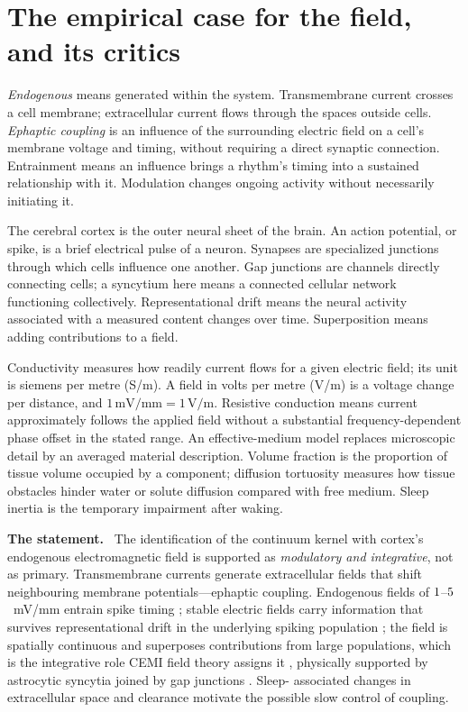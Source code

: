 \documentclass[11pt]{article}
\newcommand{\statement}{\par\smallskip\noindent\textbf{The statement.}\ }
\begin{document}
\section{The empirical case for the field, and its critics}

\emph{Endogenous} means generated within the system. Transmembrane current
crosses a cell membrane; extracellular current flows through the spaces
outside cells. \emph{Ephaptic coupling} is an influence of the surrounding
electric field on a cell's membrane voltage and timing, without requiring a
direct synaptic connection. Entrainment means an influence brings a rhythm's
timing into a sustained relationship with it. Modulation changes ongoing
activity without necessarily initiating it.

The cerebral cortex is the outer neural sheet of the brain. An action
potential, or spike, is a brief electrical pulse of a neuron. Synapses are
specialized junctions through which cells influence one another. Gap junctions
are channels directly connecting cells; a syncytium here means a connected
cellular network functioning collectively. Representational drift means the
neural activity associated with a measured content changes over time.
Superposition means adding contributions to a field.

Conductivity measures how readily current flows for a given electric field;
its unit is siemens per metre (S/m). A field in volts per metre (V/m) is a
voltage change per distance, and $1\,\mathrm{mV/mm}=1\,\mathrm{V/m}$.
Resistive conduction means current approximately follows the applied field
without a substantial frequency-dependent phase offset in the stated range.
An effective-medium model replaces microscopic detail by an averaged material
description. Volume fraction is the proportion of tissue volume occupied by
a component; diffusion tortuosity measures how tissue obstacles hinder water
or solute diffusion compared with free medium. Sleep inertia is the temporary
impairment after waking.

\statement
The identification of the continuum kernel with cortex's endogenous
electromagnetic field is supported as \emph{modulatory and integrative}, not as
primary. Transmembrane currents generate extracellular fields that shift
neighbouring membrane potentials---ephaptic coupling. Endogenous fields of
$1$--$5$~mV/mm entrain spike timing
\citep{frohlich2010,anastassiou2015}; stable electric fields carry information
that survives representational drift in the underlying spiking population
\citep{pinotsis2022,pinotsis2023ephaptic,pinotsis2023cytoelectric}; the field
is spatially continuous and superposes contributions from large populations,
which is the integrative role CEMI field theory assigns it
\citep{mcfadden2002,mcfadden2020,pockett2012}, physically supported by
astrocytic syncytia joined by gap junctions \citep{verkhratsky2018}. Sleep-
associated changes in extracellular space and clearance \citep{xie2013}
motivate the possible slow control of coupling.
\end{document}
